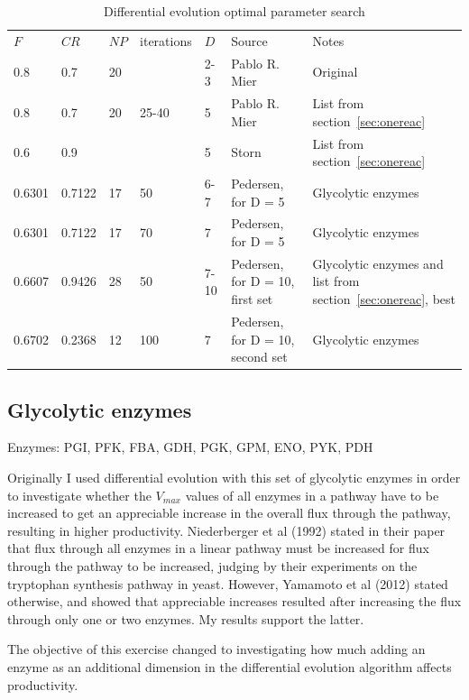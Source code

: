 \documentclass[parskip=full]{scrreprt}
\begin{document}
\begin{table}[htbp]
  \caption{Differential evolution optimal parameter search}
  \label{tab:deoptimise}
  \centering
  \begin{tabular}{lllllll}
    $F$ & $CR$ & $NP$ & iterations & $D$ & Source & Notes\\
    0.8 & 0.7 & 20 & & 2-3 & Pablo R. Mier & Original\\
    0.8 & 0.7 & 20 & 25-40 & 5 & Pablo R. Mier & List from section~\ref{sec:onereac}\\
    0.6 & 0.9 & \< 40 & \> 20 & 5 & Storn & List from section~\ref{sec:onereac}\\
    0.6301 & 0.7122 & 17 & 50 & 6-7 & Pedersen, for D = 5 & Glycolytic enzymes\\
    0.6301 & 0.7122 & 17 & 70 & 7 & Pedersen, for D = 5 & Glycolytic enzymes\\
    0.6607 & 0.9426 & 28 & 50 & 7-10 & Pedersen, for D = 10, first set & Glycolytic enzymes and list from section~\ref{sec:onereac}, best\\
    0.6702 & 0.2368 & 12 & 100 & 7 & Pedersen, for D = 10, second set & Glycolytic enzymes
  \end{tabular}
\end{table}


\subsection{Glycolytic enzymes}
\label{ssec:glycolytic}

Enzymes: PGI, PFK, FBA, GDH, PGK, GPM, ENO, PYK, PDH

Originally I used differential evolution with this set of glycolytic enzymes in order to investigate whether the $V_{max}$ values of all enzymes in a pathway have to be increased to get an appreciable increase in the overall flux through the pathway, resulting in higher productivity. Niederberger et al (1992) stated in their paper that flux through all enzymes in a linear pathway must be increased for flux through the pathway to be increased, judging by their experiments on the tryptophan synthesis pathway in yeast. However, Yamamoto et al (2012) stated otherwise, and showed that appreciable increases resulted after increasing the flux through only one or two enzymes. My results support the latter.

The objective of this exercise changed to investigating how much adding an enzyme as an additional dimension in the differential evolution algorithm affects productivity.
\end{document}
